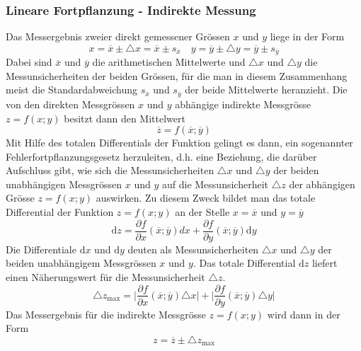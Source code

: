 \subsubsection{Lineare Fortpflanzung - Indirekte Messung}
Das Messergebnis zweier direkt gemessener Grössen $x$ und $y$ liege in der Form
\begin{equation}
\boxed{x=\overline{x}\pm\triangle x=\overline{x}\pm s_{\overline{x}}}\quad \boxed{y=\overline{y}\pm\triangle y=\overline{y}\pm s_{\overline{y}}}
\end{equation}
Dabei sind $\overline{x}$ und $\overline{y}$ die arithmetischen Mittelwerte und $\triangle x$ und $\triangle y$ die Messunsicherheiten der beiden Grössen, für die man in diesem Zusammenhang meist die Standardabweichung $s_{\overline{x}}$ und $s_{\overline{y}}$ der beide Mittelwerte heranzieht. 
\newline\newline
Die von den direkten Messgrössen $x$ und $y$ abhängige indirekte Messgrösse $z=f\left(x; y\right)$ besitzt dann den Mittelwert
\begin{equation}
\boxed{\overline{z}=f\left(\overline{x}; \overline{y}\right)}
\end{equation}
Mit Hilfe des totalen Differentials der Funktion gelingt es dann, ein sogenannter Fehlerfortpflanzungsgesetz herzuleiten, d.h. eine Beziehung, die darüber Aufschluss gibt, wie sich die Messunsicherheiten $\triangle x$ und $\triangle y$ der beiden unabhängigen Messgrössen $x$ und $y$ auf die Messunsicherheit $\triangle z$ der abhängigen Grösse $z=f\left(x; y\right)$ auswirken. Zu diesem Zweck bildet man das totale Differential der Funktion $z=f\left(x; y\right)$ an der Stelle $x=\overline{x}$ und $y=\overline{y}$
\begin{equation}
\boxed{\text{d}z=\dfrac{\partial f}{\partial x}\left(\overline{x}; \overline{y}\right)\text{}d x+\dfrac{\partial f}{\partial y}\left(\overline{x}; \overline{y}\right)\text{d} y}
\end{equation}
Die Differentiale $\text{d}x$ und $\text{d}y$ deuten als Messunsicherheiten $\triangle x$ und $\triangle y$ der beiden unabhängigem Messgrössen $x$ und $y$. Das totale Differential $\text{d}z$ liefert einen Näherungswert für die Messunsicherheit $\triangle z$.
\begin{equation}
\boxed{\triangle z_{\text{max}}=\Big\vert \dfrac{\partial f}{\partial x}\left(\overline{x}; \overline{y}\right)\triangle x\Big\vert+\Big\vert \dfrac{\partial f}{\partial y}\left(\overline{x}; \overline{y}\right)\triangle y\Big\vert}
\end{equation}
Das Messergebnis für die indirekte Messgrösse $z=f\left(x; y\right)$ wird dann in der Form
\begin{equation}
\boxed{z=\overline{z}\pm \triangle z_{\text{max}}}
\end{equation}
